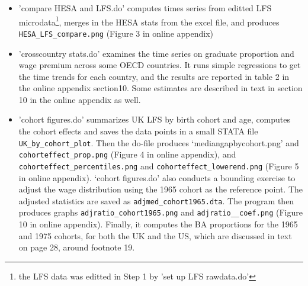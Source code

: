 \documentclass[12pt]{article}
\begin{document}
\begin{itemize}
\item 'compare HESA and LFS.do' computes times series from editted LFS microdata\footnote{the LFS data was editted in Step 1 by 'set up LFS rawdata.do'}, merges in the HESA stats from the excel file, and produces \texttt{HESA\_LFS\_compare.png} (Figure 3 in online appendix)
\item 'crosscountry stats.do' examines the time series on graduate proportion and wage premium across some OECD countries. It runs simple regressions to get the time trends for each country, and the results are reported in table 2 in the online appendix section10. Some estimates are described in text in section 10 in the online appendix as well.
\item 'cohort figures.do’ summarizes UK LFS by birth cohort and age, computes the cohort effects and saves the data points in a small STATA file \texttt{UK\_by\_cohort\_plot}. Then the do-file produces ‘mediangapbycohort.png’ and \texttt{cohorteffect\_prop.png} (Figure 4 in online appendix), and \texttt{cohorteffect\_percentiles.png} and \texttt{cohorteffect\_lowerend.png} (Figure 5 in online appendix). ‘cohort figures.do’ also conducts a bounding exercise to adjust the wage distribution using the 1965 cohort as the reference point. The adjusted statistics are saved as \texttt{adjmed\_cohort1965.dta}. The program then produces graphs \texttt{adjratio\_cohort1965.png} and \texttt{adjratio\_\_coef.png} (Figure 10 in online appendix). Finally, it computes the BA proportions for the 1965 and 1975 cohorts, for both the UK and the US, which are discussed in text on page 28, around footnote 19.

\end{itemize}
\end{document}
